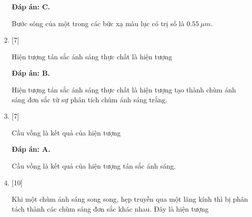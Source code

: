\begin{enumerate}[label=\bfseries Câu \arabic*:]
	\loigiai
	{		\textbf{Đáp án: C.}
		
Bước sóng của một trong các bức xạ màu lục có trị số là $\SI{0,55}{\mu m}$.
		
	}

    \item {} [7]
    
	\cauhoi
	{Hiện tượng tán sắc ánh sáng thực chất là hiện tượng
	}
	
	\loigiai
	{		\textbf{Đáp án: B.}
		
Hiện tượng tán sắc ánh sáng thực chất là hiện tượng tạo thành chùm ánh sáng đơn sắc từ sự phân tích chùm ánh sáng trắng.
		
	}

    \item {} [7]
    
	\cauhoi
	{Cầu vồng là kết quả của hiện tượng
	}
	
	\loigiai
	{		\textbf{Đáp án: A.}
		
Cầu vồng là kết quả của hiện tượng tán sắc ánh sáng.
		
	}

    \item {} [10]
    
	\cauhoi
	{Khi một chùm ánh sáng song song, hẹp truyền qua một lăng kính thì bị phân tách thành các chùm sáng đơn sắc khác nhau. Đây là hiện tượng
	}
	

\end{enumerate}

